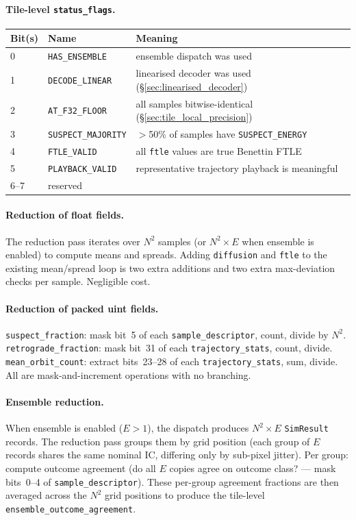 \documentclass[11pt]{report}
\begin{document}
\paragraph{Tile-level \texttt{status\_flags}.}
\begin{center}
\begin{tabular}{lll}
\toprule
Bit(s) & Name & Meaning \\
\midrule
0 & \texttt{HAS\_ENSEMBLE} & ensemble dispatch was used \\
1 & \texttt{DECODE\_LINEAR} & linearised decoder was used (\S\ref{sec:linearised_decoder}) \\
2 & \texttt{AT\_F32\_FLOOR} & all samples bitwise-identical (\S\ref{sec:tile_local_precision}) \\
3 & \texttt{SUSPECT\_MAJORITY} & $>$50\% of samples have \texttt{SUSPECT\_ENERGY} \\
4 & \texttt{FTLE\_VALID} & all \texttt{ftle} values are true Benettin FTLE \\
5 & \texttt{PLAYBACK\_VALID} & representative trajectory playback is meaningful \\
6--7 & reserved & \\
\bottomrule
\end{tabular}
\end{center}

\paragraph{Reduction of float fields.} The reduction pass iterates over $N^2$ samples (or $N^2\times E$ when ensemble is enabled) to compute means and spreads. Adding \texttt{diffusion} and \texttt{ftle} to the existing mean/spread loop is two extra additions and two extra max-deviation checks per sample. Negligible cost.

\paragraph{Reduction of packed uint fields.} \texttt{suspect\_fraction}: mask bit~5 of each \texttt{sample\_descriptor}, count, divide by $N^2$. \texttt{retrograde\_fraction}: mask bit~31 of each \texttt{trajectory\_stats}, count, divide. \texttt{mean\_orbit\_count}: extract bits~23--28 of each \texttt{trajectory\_stats}, sum, divide. All are mask-and-increment operations with no branching.

\paragraph{Ensemble reduction.} When ensemble is enabled ($E>1$), the dispatch produces $N^2\times E$ \texttt{SimResult} records. The reduction pass groups them by grid position (each group of $E$ records shares the same nominal IC, differing only by sub-pixel jitter). Per group: compute outcome agreement (do all $E$ copies agree on outcome class? --- mask bits~0--4 of \texttt{sample\_descriptor}). These per-group agreement fractions are then averaged across the $N^2$ grid positions to produce the tile-level \texttt{ensemble\_outcome\_agreement}.
\end{document}

